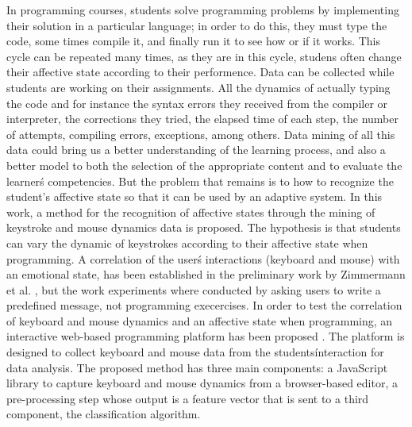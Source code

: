 \documentclass[a4paper,twoside]{article}
\begin{document}
In programming courses, students solve programming problems by implementing
their solution in a particular language; in order to do this, they
must type the code, some times compile it, and finally run it to see how or if
it works. This cycle can be repeated many times, as they are in this cycle,
studens often change their affective state according to their performence.
Data can be collected while students are working on their assignments.
All the dynamics of actually typing the code and for instance
the syntax errors they received from the compiler or interpreter, the
corrections they tried, the elapsed time of each step, the number of attempts,
compiling errors, exceptions, among others. Data mining of all this data could
bring us a better understanding of the learning process, and also a better
model to both the selection of the appropriate content and to evaluate the
learner\'s competencies. But the problem that remains is to how to recognize
the student's affective state so that it can be used by an adaptive system.
In this work, a method for the recognition of affective states through the
mining of keystroke and mouse dynamics data is proposed.
The hypothesis is that students can vary the dynamic of keystrokes according
to their affective state when programming. A correlation of the
user\'s interactions (keyboard and mouse) with an emotional state, has been
established in the preliminary work by Zimmermann
et al. \cite{zimmermann2003affective}, but the work experiments where
conducted by asking users to write a predefined message, not programming
execercises.
In order to test the correlation of keyboard and mouse dynamics and an
affective state when programming, an interactive web-based
programming platform has been proposed \cite{ijcci17}.
The platform is designed to collect keyboard and mouse data from the students\' interaction for data analysis. The proposed method has three main components: a JavaScript library to capture keyboard and mouse dynamics from a browser-based editor, a pre-processing step whose output is a feature vector that is sent to a third component, the classification algorithm.
\end{document}
